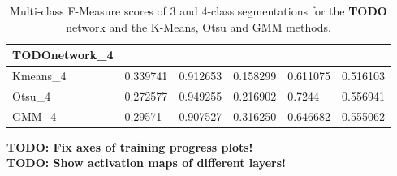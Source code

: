 \begin {table}
\begin{flushleft}
\begin {tabular}[!ht]{|l|l|l|l|l|l|}
			\textbf{TODOnetwork}\_4& & & & &  \\ \hline
			Kmeans\_4& 0.339741& 0.912653& 0.158299& 0.611075& 0.516103 \\ \hline
			Otsu\_4& 0.272577& 0.949255& 0.216902& 0.7244& 0.556941 \\ \hline
			GMM\_4& 0.29571& 0.907527& 0.316250& 0.646682& 0.555062 \\ \hline
		\end {tabular}
	\end {flushleft}
\caption[Multi-class F-Measure scores for final network and other image segmentation metods.]{Multi-class F-Measure scores of 3 and 4-class segmentations for the \textbf{TODO} network and the K-Means, Otsu and GMM methods.}
\label{tab:resultsfinal}
\end {table}

\textbf{TODO: Fix axes of training progress plots!}\\
\textbf{TODO: Show activation maps of different layers!}\\
